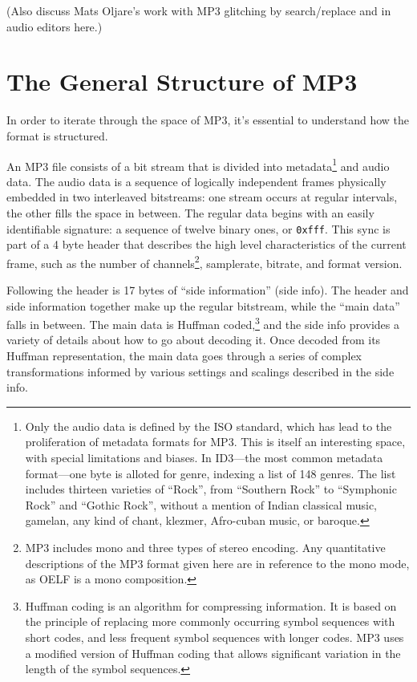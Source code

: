 \documentclass{thesis}
\begin{document}
	(Also discuss Mats Oljare's work with MP3 glitching by search/replace and in audio editors here.)

\section{The General Structure of MP3}
	In order to iterate through the space of MP3, it's essential to understand how the format is structured.
	
	An MP3 file consists of a bit stream that is divided into metadata\footnote{Only the audio data is defined by the ISO standard, which has lead to the proliferation of metadata formats for MP3. This is itself an interesting space, with special limitations and biases. In ID3---the most common metadata format---one byte is alloted for genre, indexing a list of 148 genres. The list includes thirteen varieties of ``Rock'', from ``Southern Rock'' to ``Symphonic Rock'' and ``Gothic Rock'', without a mention of Indian classical music, gamelan, any kind of chant, klezmer, Afro-cuban music, or baroque.} and audio data. The audio data is a sequence of logically independent frames physically embedded in two interleaved bitstreams: one stream occurs at regular intervals, the other fills the space in between. The regular data begins with an easily identifiable signature: a sequence of twelve binary ones, or \verb!0xfff!. This sync is part of a 4 byte header that describes the high level characteristics of the current frame, such as the number of channels\footnote{MP3 includes mono and three types of stereo encoding. Any quantitative descriptions of the MP3 format given here are in reference to the mono mode, as OELF is a mono composition.}, samplerate, bitrate, and format version.
	
	Following the header is 17 bytes of ``side information'' (side info). The header and side information together make up the regular bitstream, while the ``main data'' falls in between. The main data is Huffman coded,\footnote{Huffman coding is an algorithm for compressing information. It is based on the principle of replacing more commonly occurring symbol sequences with short codes, and less frequent symbol sequences with longer codes. MP3 uses a modified version of Huffman coding that allows significant variation in the length of the symbol sequences.} and the side info provides a variety of details about how to go about decoding it. Once decoded from its Huffman representation, the main data goes through a series of complex transformations informed by various settings and scalings described in the side info.
	
\end{document}

